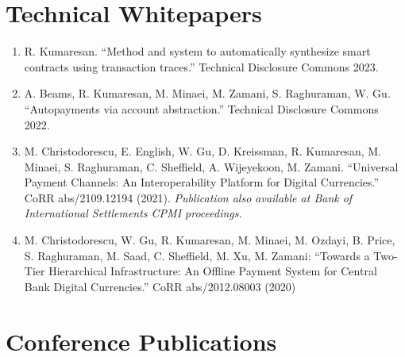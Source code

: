 \documentclass[11pt]{article}
\begin{document}
\section{Technical Whitepapers}
\begin{enumerate}[leftmargin=*, itemsep=1pt]
    \item R. Kumaresan. ``Method and system to automatically synthesize smart contracts using transaction traces.'' Technical Disclosure Commons 2023.
    
    \item A. Beams, R. Kumaresan, M. Minaei, M. Zamani, S. Raghuraman, W. Gu. ``Autopayments via account abstraction.'' Technical Disclosure Commons 2022.
    
    \item M. Christodorescu, E. English, W. Gu, D. Kreissman, R. Kumaresan, M. Minaei, S. Raghuraman, C. Sheffield, A. Wijeyekoon, M. Zamani. ``Universal Payment Channels: An Interoperability Platform for Digital Currencies.'' CoRR abs/2109.12194 (2021). \textit{Publication also available at Bank of International Settlements CPMI proceedings.}
    
    \item M. Christodorescu, W. Gu, R. Kumaresan, M. Minaei, M. Ozdayi, B. Price, S. Raghuraman, M. Saad, C. Sheffield, M. Xu, M. Zamani: ``Towards a Two-Tier Hierarchical Infrastructure: An Offline Payment System for Central Bank Digital Currencies.'' CoRR abs/2012.08003 (2020)
\end{enumerate}

\section{Conference Publications}
\end{document}
